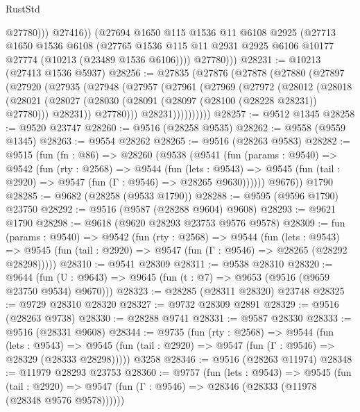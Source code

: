 \begin{lexlean}{RustStd}
\begin{coremodule}
                  @27780)))
            @27416))
        (@27694
          @1650
          @115
          @1536
          @11
          @6108
          @2925
          (@27713
            @1650
            @1536
            @6108
            (@27765 @1536 @115 @11 @2931 @2925 @6106 @10177 @27774 (@10213 (@23489 @1536 @6106))))
          @27780)))
@28231 := @10213 (@27413 @1536 @5937)
@28256 := @27835
    (@27876
      (@27878
        (@27880
          (@27897
            (@27920
              (@27935
                (@27948
                  (@27957
                    (@27961
                      (@27969
                        (@27972
                          (@28012
                            (@28018
                              (@28021
                                (@28027
                                  (@28030 (@28091 (@28097 (@28100 (@28228 @28231)) @27780)))
                                  @28231))
                              @27780)))
                        @28231))))))))))
@28257 := @9512 @1345
@28258 := @9520 @23747
@28260 := @9516 (@28258 @9535)
@28262 := @9558 (@9559 @1345)
@28263 := @9554 @28262
@28265 := @9516 (@28263 @9583)
@28282 := @9515
    (fun (fn : @86) =>
    @28260
      (@9538
        (@9541
          (fun (params : @9540) =>
          @9542
            (fun (rty : @2568) =>
            @9544
              (fun (lets : @9543) =>
              @9545 (fun (tail : @2920) => @9547 (fun (Γ : @9546) => @28265 @9630))))))
        @9676))
    @1790
@28285 := @9682 (@28258 (@9533 @1790))
@28288 := @9595 (@9596 @1790) @23750
@28292 := @9516 (@9587 (@28288 @9604) @9608)
@28293 := @9621 @1790
@28298 := @9618 (@9620 @28293 @23753 @9576 @9578)
@28309 := fun (params : @9540) =>
  @9542
    (fun (rty : @2568) =>
    @9544
      (fun (lets : @9543) =>
      @9545 (fun (tail : @2920) => @9547 (fun (Γ : @9546) => @28265 (@28292 @28298)))))
@28310 := @9541 @28309
@28311 := @9538 @28310
@28320 := @9644
    (fun (U : @9643) => @9645 (fun (t : @7) => @9653 (@9516 (@9659 @23750 @9534) @9670)))
@28323 := @28285 (@28311 @28320) @23748
@28325 := @9729 @28310 @28320
@28327 := @9732 @28309 @2891
@28329 := @9516 (@28263 @9738)
@28330 := @28288 @9741
@28331 := @9587 @28330
@28333 := @9516 (@28331 @9608)
@28344 := @9735
    (fun (rty : @2568) =>
    @9544
      (fun (lets : @9543) =>
      @9545 (fun (tail : @2920) => @9547 (fun (Γ : @9546) => @28329 (@28333 @28298)))))
    @3258
@28346 := @9516 (@28263 @11974)
@28348 := @11979 @28293 @23753
@28360 := @9757
    (fun (lets : @9543) =>
    @9545
      (fun (tail : @2920) =>
      @9547 (fun (Γ : @9546) => @28346 (@28333 (@11978 (@28348 @9576 @9578))))))

\end{coremodule}
\end{lexlean}
